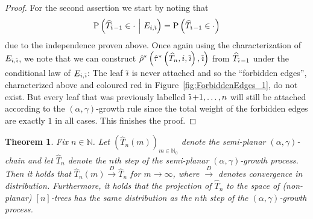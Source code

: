 \documentclass[a4paper, final]{amsart}
\theoremstyle{plain}
\newtheorem{thm}{Theorem}[section]
\theoremstyle{definition}
\newcommand{\That}[1][T]{\widehat{#1}}
\DeclareMathOperator{\tildei}{\tilde{\textit{\i}}}
\newcommand{\nin}{{n \in \mathbb{N}}}
\newcommand{\dcon}{\xrightarrow{D}}
\renewcommand{\P}{\mathrm{P}}
\newcommand{\N}{\mathbb{N}}
\begin{document}
\begin{proof}
    For the second assertion we start by noting that
    \begin{align*}
      \P \left( \That_{\tildei - 1} \in \cdot \ \middle \vert \ E_{i,\tildei} \right) = \P \left( \That_{\tildei - 1} \in \cdot \right)
    \end{align*}
    due to the independence proven above.
    Once again using the characterization of $E_{i, \tildei}$, we note that we can construct $\hat{\rho}^* \left( \hat{\tau}^* \left( \That_n, i, \tildei \right), \tildei \right)$ from $\That_{\tildei - 1}$ under the conditional law of $E_{i, \tildei}$:
    The leaf $\tildei$ is never attached and so the ``forbidden edges'', characterized above and coloured red in Figure~\ref{fig:ForbiddenEdges_1}, do not exist.
    But every leaf that was previously labelled $\tildei+1, \ldots, n$ will still be attached according to the $(\alpha, \gamma)$-growth rule since the total weight of the forbidden edges are exactly $1$ in all cases.
    This finishes the proof.
\end{proof}
%
\begin{thm}%
\label{thm:planarstationarity}
  Fix $\nin$.
  Let ${\left( \That_n(m) \right)}_{m \in \N_0}$ denote the semi-planar $(\alpha, \gamma)$-chain and let $\That_n$ denote the $n$th step of the semi-planar $(\alpha, \gamma)$-growth process.
  Then it holds that $\That_n(m) \dcon \That_n$ for $m \to \infty$, where $\dcon$ denotes convergence in distribution.
  Furthermore, it holds that the projection of $\That_n$ to the space of (non-planar) $[n]$-trees has the same distribution as the $n$th step of the $(\alpha, \gamma)$-growth process.
\end{thm}
%
\end{document}
